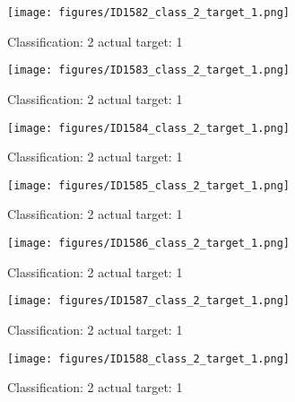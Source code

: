 \begin{figure}[h!]
\begin{center}
\texttt{[image: figures/ID1582\_class\_2\_target\_1.png]}
\end{center}
\caption{ Classification: 2 actual target: 1}
\label{fig:ID1582_class_2_target_1}
\end{figure}
\begin{figure}[h!]
\begin{center}
\texttt{[image: figures/ID1583\_class\_2\_target\_1.png]}
\end{center}
\caption{ Classification: 2 actual target: 1}
\label{fig:ID1583_class_2_target_1}
\end{figure}
\begin{figure}[h!]
\begin{center}
\texttt{[image: figures/ID1584\_class\_2\_target\_1.png]}
\end{center}
\caption{ Classification: 2 actual target: 1}
\label{fig:ID1584_class_2_target_1}
\end{figure}
\begin{figure}[h!]
\begin{center}
\texttt{[image: figures/ID1585\_class\_2\_target\_1.png]}
\end{center}
\caption{ Classification: 2 actual target: 1}
\label{fig:ID1585_class_2_target_1}
\end{figure}
\begin{figure}[h!]
\begin{center}
\texttt{[image: figures/ID1586\_class\_2\_target\_1.png]}
\end{center}
\caption{ Classification: 2 actual target: 1}
\label{fig:ID1586_class_2_target_1}
\end{figure}
\begin{figure}[h!]
\begin{center}
\texttt{[image: figures/ID1587\_class\_2\_target\_1.png]}
\end{center}
\caption{ Classification: 2 actual target: 1}
\label{fig:ID1587_class_2_target_1}
\end{figure}
\begin{figure}[h!]
\begin{center}
\texttt{[image: figures/ID1588\_class\_2\_target\_1.png]}
\end{center}
\caption{ Classification: 2 actual target: 1}
\label{fig:ID1588_class_2_target_1}
\end{figure}

